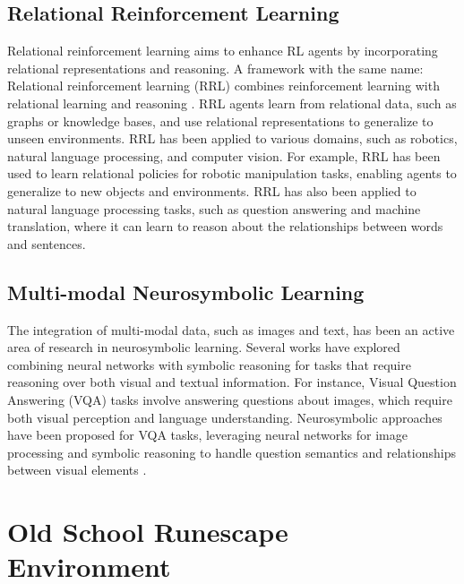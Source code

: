 \documentclass{article}
\begin{document}
\subsection{Relational Reinforcement Learning}

Relational reinforcement learning aims to enhance RL agents by incorporating relational representations and reasoning. A framework with the same name: Relational reinforcement learning (RRL) combines reinforcement learning with relational learning and reasoning \cite{dzeroski2001relational}. RRL agents learn from relational data, such as graphs or knowledge bases, and use relational representations to generalize to unseen environments. RRL has been applied to various domains, such as robotics, natural language processing, and computer vision. For example, RRL has been used to learn relational policies for robotic manipulation tasks, enabling agents to generalize to new objects and environments. RRL has also been applied to natural language processing tasks, such as question answering and machine translation, where it can learn to reason about the relationships between words and sentences.


\subsection{Multi-modal Neurosymbolic Learning}
The integration of multi-modal data, such as images and text, has been an active area of research in neurosymbolic learning. Several works have explored combining neural networks with symbolic reasoning for tasks that require reasoning over both visual and textual information. For instance, Visual Question Answering (VQA) tasks involve answering questions about images, which require both visual perception and language understanding. Neurosymbolic approaches have been proposed for VQA tasks, leveraging neural networks for image processing and symbolic reasoning to handle question semantics and relationships between visual elements \cite{hu2017learning}.

\section{Old School Runescape Environment}
\end{document}
